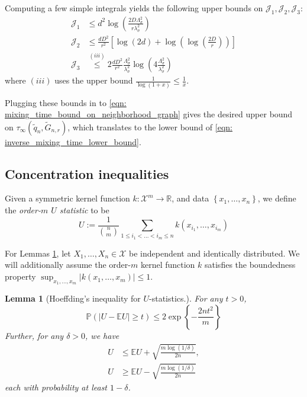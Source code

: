 \documentclass{article}
\newcommand{\set}[1]{\left\{#1\right\}}
\newcommand{\abs}[1]{\left \lvert #1 \right \rvert}
\newcommand{\Reals}{\mathbb{R}}
\newcommand{\1}{\mathbf{1}}
\theoremstyle{aldenthm}
\newtheorem{lemma}{Lemma}
\begin{document}
Computing a few simple integrals yields the following upper bounds on $\mathcal{J}_1, \mathcal{J}_2, \mathcal{J}_3$:
\begin{align*}
\mathcal{J}_1 & \leq d^2 \log\left( \frac{2D\Lambda_{\sigma}^2}{r\lambda_{\sigma}^2} \right) \\
\mathcal{J}_2 & \leq \frac{dD^2}{r^2} \left[ \log\left(2d\right) + \log\left(\log\left(\frac{2D}{r}\right)\right) \right] \\
\mathcal{J}_3 & \overset{(iii)}{\leq} 2 \frac{dD^2}{r^2} \frac{\Lambda_{\sigma}^2}{\lambda_{\sigma}^2} \log\left(4 \frac{\Lambda_{\sigma}^2}{\lambda_{\sigma}^2}\right)
\end{align*}
where $(iii)$ uses the upper bound $\frac{1}{\log(1 + x)} \leq \frac{1}{x}$.

Plugging these bounds in to \eqref{eqn: mixing_time_bound_on_neighborhood_graph} gives the desired upper bound on $\tau_{\infty}(\widetilde{q}_n, \widetilde{G}_{n,r})$, which translates to the lower bound of \eqref{eqn: inverse_mixing_time_lower_bound}.

\subsection{Concentration inequalities}
\label{sec: concentration}
Given a symmetric kernel function $k: \mathcal{X}^m \to \Reals$, and data $\set{x_1, \ldots, x_n}$, we define the \textit{order-$m$ $U$ statistic} to be 
\begin{equation*}
U := \frac{1}{ {n \choose m} } \sum_{1 \leq i_1 < \ldots < i_m \leq n} k(x_{i_1},\ldots,x_{i_m})
\end{equation*}

For Lemmas \ref{lem: bounded_difference}, let $X_1, \ldots, X_n \in \mathcal{X}$ be independent and identically distributed. We will additionally assume the order-$m$ kernel function $k$ satisfies the boundedness property $\sup_{x_1, \ldots, x_m} \abs{k(x_1, \ldots, x_m)} \leq 1$. 

\begin{lemma}[Hoeffding's inequality for $U$-statistics.]
	\label{lem: bounded_difference}
	For any $t > 0$,
	\begin{equation*}
	\mathbb{P}(\abs{U - \mathbb{E}U} \geq t) \leq 2 \exp\left\{- \frac{2nt^2}{m}\right\}
	\end{equation*}
	Further, for any $\delta > 0$, we have
	\begin{align*}
	U & \leq \mathbb{E}U + \sqrt{\frac{m \log(1 / \delta)}{2n} }, \\
	U & \geq \mathbb{E}U - \sqrt{\frac{m \log(1 / \delta)}{2n} }
	\end{align*}
	each with probability at least $1 - \delta$. 
\end{lemma}
\end{document}
